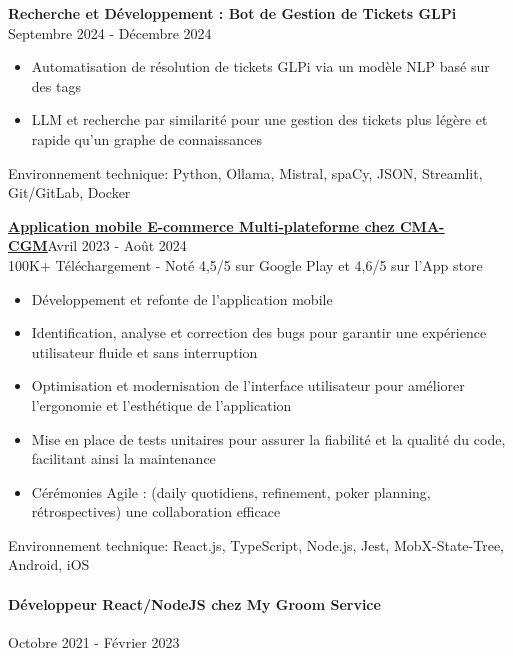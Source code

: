 \documentclass{article}
\begin{document}
\noindent
\textbf{Recherche et Développement : Bot de Gestion de Tickets GLPi} \hspace*{\fill}Septembre 2024 - Décembre 2024

\raggedright 
\begin{itemize}
  \item{Automatisation de résolution de tickets GLPi via un modèle NLP basé sur des tags}
  \item{LLM et recherche par similarité pour une gestion des tickets plus légère et rapide qu’un graphe de connaissances}
\end{itemize}
\noindent
\vspace{1ex}
Environnement technique: Python, Ollama, Mistral, spaCy, JSON, Streamlit, Git/GitLab, Docker

\noindent
\href{https://www.cma-cgm.fr/products-services/ecommerce/applicationmobile}{\textbf{\underline{Application mobile E-commerce Multi-plateforme chez CMA-CGM}}}\hspace*{\fill}Avril 2023 - Août 2024  \\
100K+ Téléchargement - Noté 4,5/5 sur Google Play et 4,6/5 sur l'App store

\raggedright  
\begin{itemize}
  \item{Développement et refonte de l’application mobile}
  \item{Identification, analyse et correction des bugs pour garantir une expérience utilisateur fluide et
    sans interruption}
  \item{Optimisation et modernisation de l'interface utilisateur pour améliorer l'ergonomie et l'esthétique
    de l'application}
  \item{Mise en place de tests unitaires pour assurer la fiabilité et la qualité du code, facilitant ainsi la
    maintenance}
  \item{Cérémonies Agile : (daily quotidiens, refinement, poker planning, rétrospectives) une collaboration efficace}
\end{itemize}
\noindent
Environnement technique: React.js, TypeScript, Node.js, Jest, MobX-State-Tree, Android, iOS
\paragraph{Développeur React/NodeJS chez My Groom Service}\hspace*{\fill}Octobre 2021 - Février 2023
\end{document}
